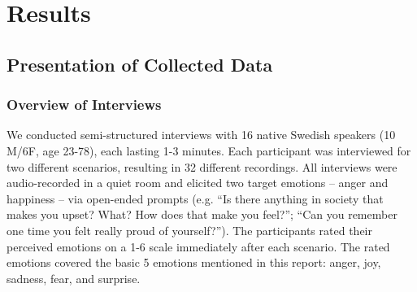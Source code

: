 \chapter{Results}
\label{sec:results}


\section{Presentation of Collected Data}
\subsection{Overview of Interviews}
We conducted semi-structured interviews with 16 native Swedish speakers (10 M/6F, age 23-78), each lasting 1-3 minutes. Each participant was interviewed for two different scenarios, resulting in 32 different recordings. All interviews were audio-recorded in a quiet room and elicited two target emotions – anger and happiness – via open-ended prompts (e.g. “Is there anything in society that makes you upset? What? How does that make you feel?”; “Can you remember one time you felt really proud of yourself?”). The participants rated their perceived emotions on a 1-6 scale immediately after each scenario. The rated emotions covered the basic 5 emotions mentioned in this report: anger, joy, sadness, fear, and surprise. 

